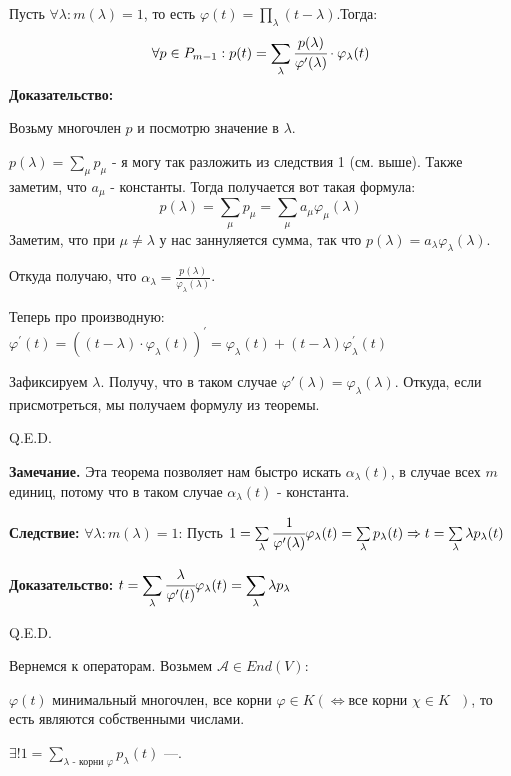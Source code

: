 
Пусть $\forall \lambda : m(\lambda) = 1$, то есть $\varphi(t) = \prod\limits_{\lambda}(t-\lambda)$.Тогда: $$ \forall p \in P_{m-1}: p(t) = \sum\limits_{\lambda}\cfrac{p(\lambda)}{\varphi'(\lambda)}\cdot \varphi_{\lambda}(t)$$
\textbf{Доказательство:}

Возьму многочлен $p$ и посмотрю значение в $\lambda$.

$p(\lambda) = \sum\limits_{\mu}p_{\mu}$ - я могу так разложить из следствия 1 (см. выше).  Также заметим, что $a_\mu$ - константы. Тогда получается вот такая формула:
$$p(\lambda) = \sum\limits_{\mu}p_{\mu}=\sum\limits_{\mu}a_\mu\varphi_{\mu}(\lambda)$$
Заметим, что при $\mu \neq \lambda$ у нас заннуляется сумма, так что $p(\lambda) = a_{\lambda }\varphi_{\lambda}(\lambda)$.

Откуда получаю, что $ \alpha_{\lambda}= \frac{p(\lambda)}{\varphi_{\lambda}(\lambda)}$.

Теперь про производную:  $\varphi^{\prime}(t)=((t- \lambda)\cdot \varphi_{\lambda}(t))^{\prime} = \varphi_{\lambda}(t) + (t- \lambda) \varphi^{\prime}_{\lambda}(t) $

Зафиксируем $\lambda$. Получу, что в таком случае $\varphi'(\lambda)=\varphi_{\lambda}(\lambda)$. Откуда, если присмотреться, мы получаем формулу из теоремы.

 \hfill Q.E.D.

\textbf{Замечание.} Эта теорема позволяет нам быстро искать $\alpha_\lambda(t)$, в случае всех $m$ единиц, потому что в таком случае $\alpha_\lambda(t)$ - константа.
 
\textbf{Следствие:} $\forall \lambda: m(\lambda)=1$: Пусть $1 = \sum\limits_{\lambda}\cfrac{1}{\varphi'(\lambda)} \varphi_\lambda(t) = \sum\limits_{\lambda}p_{\lambda}(t) \Rightarrow t = \sum\limits_{\lambda}\lambda p_{\lambda}(t)$

\textbf{Доказательство:}  $\displaystyle t = \sum\limits_{\lambda}\cfrac{\lambda}{\varphi'(t)}\varphi_{\lambda}(t) = \sum\limits_{\lambda}\lambda p_{\lambda}$

 \hfill Q.E.D.

 Вернемся к операторам. Возьмем $\mathcal{A} \in End(V)$:

$\varphi(t)$ минимальный многочлен, все корни $\varphi \in K (\Leftrightarrow \text{все корни $\chi \in K$ })$, то есть являются собственными числами.

$\exists! 1 = \sum\limits_{\lambda \text{ - корни } \varphi}p_{\lambda}(t)$ ---.


